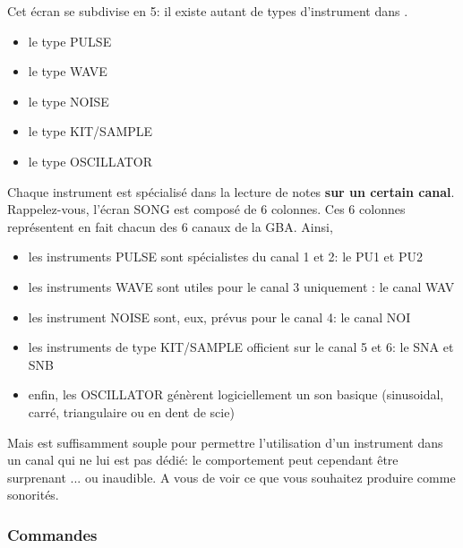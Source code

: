 Cet écran se subdivise en 5: il existe autant de types d'instrument dans \FAT.
\medskip

\begin{itemize}
    \item{le type PULSE}
    \item{le type WAVE}
    \item{le type NOISE}
    \item{le type KIT/SAMPLE}
    \item{le type OSCILLATOR}
\end{itemize}\medskip

 Chaque instrument est spécialisé dans la lecture de notes {\bf sur un certain canal}.
 Rappelez-vous, l'écran SONG est composé de 6 colonnes.
 Ces 6 colonnes représentent en fait chacun des 6 canaux de la GBA. Ainsi,
 \medskip

 \begin{itemize}
    \item{les instruments PULSE sont spécialistes du canal 1 et 2: le PU1 et PU2}
    \item{les instruments WAVE sont utiles pour le canal 3 uniquement : le canal WAV}
    \item{les instrument NOISE sont, eux, prévus pour le canal 4: le canal NOI}
    \item{les instruments de type KIT/SAMPLE officient sur le canal 5 et 6: le SNA et SNB}
    \item{enfin, les OSCILLATOR génèrent logiciellement un son basique (sinusoidal, carré, triangulaire ou en dent de scie)}
 \end{itemize}\medskip

 Mais \FAT est suffisamment souple pour permettre l'utilisation d'un instrument dans un canal qui ne lui est pas dédié:
 le comportement peut cependant être surprenant ... ou inaudible.
 A vous de voir ce que vous souhaitez produire comme sonorités.

\subsubsection{Commandes}

